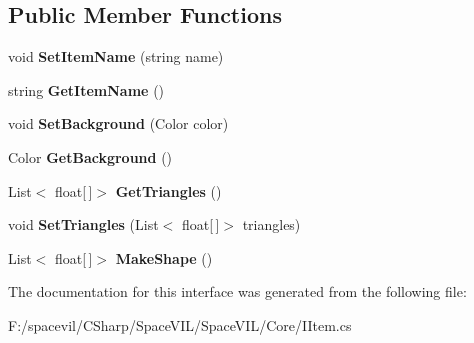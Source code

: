 \subsection*{Public Member Functions}
\begin{DoxyCompactItemize}
\item 
\mbox{\label{interface_space_v_i_l_1_1_core_1_1_i_item_ada5e10f25cf0acda62a9f83184a04617}} 
void {\bfseries Set\+Item\+Name} (string name)
\item 
\mbox{\label{interface_space_v_i_l_1_1_core_1_1_i_item_a67b78de67aee0b0c8d7c356541619f43}} 
string {\bfseries Get\+Item\+Name} ()
\item 
\mbox{\label{interface_space_v_i_l_1_1_core_1_1_i_item_a6ef6ca119a20f020431423b37ec9dc44}} 
void {\bfseries Set\+Background} (Color color)
\item 
\mbox{\label{interface_space_v_i_l_1_1_core_1_1_i_item_a4a959d4143cd1c7af29d529d31e9818d}} 
Color {\bfseries Get\+Background} ()
\item 
\mbox{\label{interface_space_v_i_l_1_1_core_1_1_i_item_a0df7980826ba9f28f5db3860caee1546}} 
List$<$ float\mbox{[}$\,$\mbox{]}$>$ {\bfseries Get\+Triangles} ()
\item 
\mbox{\label{interface_space_v_i_l_1_1_core_1_1_i_item_af06da4b3b45e6ef2718d6d431bf1d868}} 
void {\bfseries Set\+Triangles} (List$<$ float\mbox{[}$\,$\mbox{]}$>$ triangles)
\item 
\mbox{\label{interface_space_v_i_l_1_1_core_1_1_i_item_a2291723c86bdcff51721758f724526e5}} 
List$<$ float\mbox{[}$\,$\mbox{]}$>$ {\bfseries Make\+Shape} ()
\end{DoxyCompactItemize}


The documentation for this interface was generated from the following file\+:\begin{DoxyCompactItemize}
\item 
F\+:/spacevil/\+C\+Sharp/\+Space\+V\+I\+L/\+Space\+V\+I\+L/\+Core/I\+Item.\+cs\end{DoxyCompactItemize}
